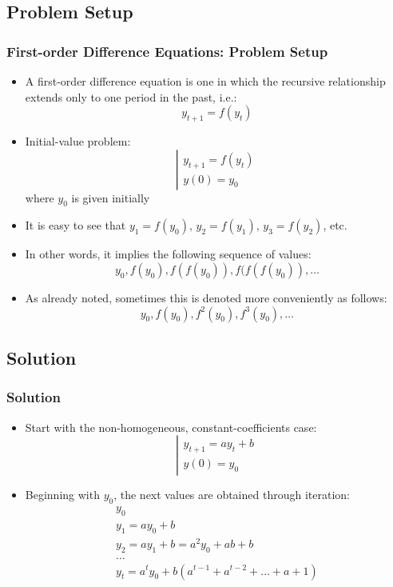 \documentclass[10pt,usenames,dvipsnames]{beamer}
\theoremstyle{definition}
\begin{document}
\subsection{Problem Setup}
\begin{frame}[fragile]
\frametitle{First-order Difference Equations: Problem Setup}
\begin{itemize}
	\item A first-order difference equation is one in which the recursive relationship extends only to one period in the past, i.e.:
	\[
		y_{t+1} = f(y_{t})
	\]
	\item Initial-value problem:
	\[
		\left|
		\begin{array}{lcl}
			y_{t+1} = f(y_{t})\\
			y(0) = y_{0}
		\end{array}
		\right.
	\]
	where $y_{0}$ is given initially
	\item It is easy to see that $y_{1} = f(y_{0}),\, y_{2} = f(y_{1}),\, y_{3} = f(y_{2})$, etc.
	\item In other words, it implies the following sequence of values:
	\[
		y_{0}, f(y_{0}), f(f(y_{0})), f(f(f(y_{0})),\ldots
	\]
	\item As already noted, sometimes this is denoted more conveniently as follows:
	\[
		y_{0}, f(y_{0}), f^{2}(y_{0}), f^{3}(y_{0}),\ldots
	\]
\end{itemize}
\end{frame}

\subsection{Solution}
\begin{frame}[fragile]
\frametitle{Solution}
\begin{itemize}
	\item Start with the non-homogeneous, constant-coefficients case:
	\[
		\left|
		\begin{array}{lcl}
			y_{t+1} = ay_{t} + b\\
			y(0) = y_{0}
		\end{array}
		\right.
	\]
	\item Beginning with $y_{0}$, the next values are obtained through iteration:
	\[
		\begin{array}{lcl}
			y_{0}\\
			y_{1} = ay_{0} + b\\
			y_{2} = ay_{1} + b = a^{2}y_{0} + ab + b\\
			\ldots\\
			y_{t} = a^{t}y_{0} + b(a^{t-1} + a^{t-2} + \ldots + a + 1)
		\end{array}
	\]
\end{itemize}
\end{frame}
\end{document}
